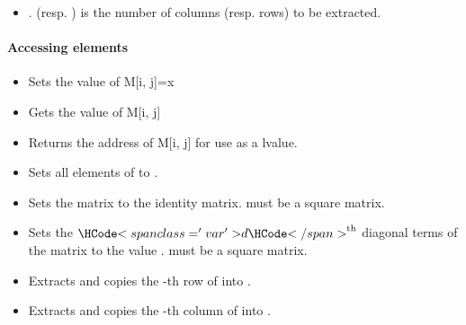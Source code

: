 \begin{itemize}
\item {}
  \sshortdescribe {}. 
  (resp. ) is the number of columns (resp. rows) to be extracted.
  
\end{itemize}  


\paragraph{Accessing elements}

\begin{itemize}
\item {}
  \sshortdescribe Sets the value of M[i, j]=x  

\item {}
  \sshortdescribe Gets the value of M[i, j]  

\item {}
  \sshortdescribe Returns the address of M[i, j] for use as a lvalue.

\item {}
  \sshortdescribe Sets all elements of  to .
  
\item {}
  \sshortdescribe Sets the matrix  to the identity
  matrix.  must be a square matrix.

\item {}
  \sshortdescribe Sets the $\var{d}^{\text{th}}$ diagonal terms of the matrix
   to the value .  must be a square matrix.

\item {}
  \sshortdescribe Extracts and copies the -th row of  into
  .

\item {}
  \sshortdescribe Extracts and copies the -th column of  into .
  

\end{itemize}
